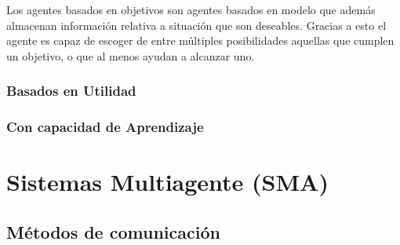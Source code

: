 Los agentes basados en objetivos son agentes basados en modelo que además
almacenan información relativa a situación que son deseables. Gracias a esto el
agente es capaz de escoger de entre múltiples posibilidades aquellas que
cumplen un objetivo, o que al menos ayudan a alcanzar uno.

\subsubsection*{Basados en Utilidad}

\subsubsection*{Con capacidad de Aprendizaje}

\section*{Sistemas Multiagente (SMA)}


\subsection*{Métodos de comunicación}
